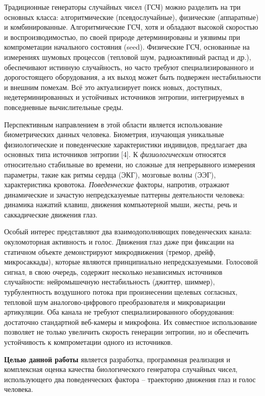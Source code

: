 \documentclass[14pt, a4paper]{extreport}
\begin{document}
Традиционные генераторы случайных чисел (ГСЧ) можно разделить на три основных класса: алгоритмические (псевдослучайные), физические (аппаратные) и комбинированные. Алгоритмические ГСЧ, хотя и обладают высокой скоростью и воспроизводимостью, по своей природе детерминированы и уязвимы при компрометации начального состояния (seed). Физические ГСЧ, основанные на измерениях шумовых процессов (тепловой шум, радиоактивный распад и др.), обеспечивают истинную случайность, но часто требуют специализированного и дорогостоящего оборудования, а их выход может быть подвержен нестабильности и внешним помехам. Всё это актуализирует поиск новых, доступных, недетерминированных и устойчивых источников энтропии, интегрируемых в повседневные вычислительные среды.

Перспективным направлением в этой области является использование биометрических данных человека. Биометрия, изучающая уникальные физиологические и поведенческие характеристики индивидов, предлагает два основных типа источников энтропии [4]. К \textit{физиологическим} относятся относительно стабильные во времени, но сложные для непрерывного измерения параметры, такие как ритмы сердца (ЭКГ), мозговые волны (ЭЭГ), характеристика кровотока. \textit{Поведенческие} факторы, напротив, отражают динамические и зачастую непредсказуемые паттерны деятельности человека: динамика нажатий клавиш, движения компьютерной мыши, жесты, речь и саккадические движения глаз.

Особый интерес представляют два взаимодополняющих поведенческих канала: окуломоторная активность и голос. Движения глаз даже при фиксации на статичном объекте демонстрируют микродвижения (тремор, дрейф, микросаккады), которые являются принципиально непредсказуемыми. Голосовой сигнал, в свою очередь, содержит несколько независимых источников случайности: нейромышечную нестабильность (джиттер, шиммер), турбулентность воздушного потока при произнесении щелевых согласных, тепловой шум аналогово-цифрового преобразователя и микровариации артикуляции. Оба канала не требуют специализированного оборудования: достаточно стандартной веб-камеры и микрофона. Их совместное использование позволяет не только увеличить скорость генерации энтропии, но и обеспечить устойчивость к компрометации одного из источников.

\textbf{Целью данной работы} является разработка, программная реализация и комплексная оценка качества биологического генератора случайных чисел, использующего два поведенческих фактора -- траекторию движения глаз и голос человека.
\end{document}
